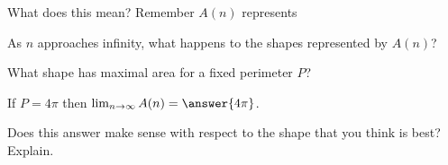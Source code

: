 \documentclass[handout,nooutcomes]{ximera}
\begin{document}
What does this mean? Remember $A(n)$ represents\\
\begin{multipleChoice}
\end{multipleChoice}
\begin{freeResponse}
As $n$ approaches infinity, what happens to the shapes represented by $A(n)$?
\end{freeResponse}

What shape has maximal area for a fixed perimeter $P$?
\begin{multipleChoice}
\end{multipleChoice}
If $P = 4\pi$ then $\lim_{n \to \infty} A(n) = \answer{4\pi}$.\\
\begin{freeResponse}
Does this answer make sense with respect to the shape that you think is best? Explain.
\end{freeResponse}
\end{document}
